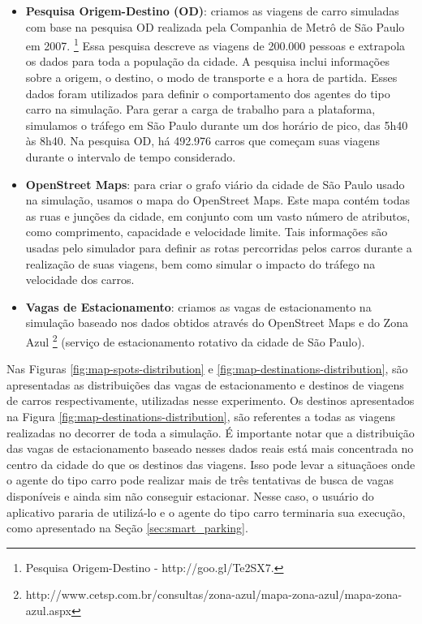 \begin{itemize}
    \item \textbf{Pesquisa Origem-Destino (OD)}: criamos as viagens de carro simuladas com base na pesquisa OD realizada pela Companhia de Metrô de São Paulo em 2007.
        \footnote{Pesquisa Origem-Destino - http://goo.gl/Te2SX7.}
        Essa pesquisa descreve as viagens de 200.000 pessoas e extrapola os dados para toda a população da cidade.
        A pesquisa inclui informações sobre a origem, o destino, o modo de transporte e a hora de partida.
        Esses dados foram utilizados para definir o comportamento dos agentes do tipo carro na simulação.
        Para gerar a carga de trabalho para a plataforma, simulamos o tráfego em São Paulo durante um dos horário de pico, das 5h40 às 8h40.
        Na pesquisa OD, há 492.976 carros que começam suas viagens durante o intervalo de tempo considerado.

    \item \textbf{OpenStreet Maps}: para criar o grafo viário da cidade de São Paulo usado na simulação, usamos o mapa do OpenStreet Maps.
        Este mapa contém todas as ruas e junções da cidade, em conjunto com um vasto número de atributos, como comprimento, capacidade e velocidade limite.
        Tais informações são usadas pelo simulador para definir as rotas percorridas pelos carros durante a realização de suas viagens, bem como simular o impacto do tráfego na velocidade dos carros.

    \item \textbf{Vagas de Estacionamento}: criamos as vagas de estacionamento na simulação baseado nos dados obtidos através do OpenStreet Maps e do Zona Azul
        \footnote{http://www.cetsp.com.br/consultas/zona-azul/mapa-zona-azul/mapa-zona-azul.aspx}
        (serviço de estacionamento rotativo da cidade de São Paulo).
\end{itemize}

Nas Figuras \ref{fig:map-spots-distribution} e \ref{fig:map-destinations-distribution}, são apresentadas as distribuições das vagas de estacionamento e destinos de viagens de carros respectivamente,
utilizadas nesse experimento.
Os destinos apresentados na Figura \ref{fig:map-destinations-distribution}, são referentes a todas as viagens realizadas no decorrer de toda a simulação.
É importante notar que a distribuição das vagas de estacionamento baseado nesses dados reais está mais concentrada no centro da cidade do que os destinos das viagens.
Isso pode levar a situaçãoes onde o agente do tipo carro pode realizar mais de três tentativas de busca de vagas disponíveis e ainda sim não conseguir estacionar.
Nesse caso, o usuário do aplicativo pararia de utilizá-lo e o agente do tipo carro terminaria sua execução, como apresentado na Seção \ref{sec:smart_parking}.


